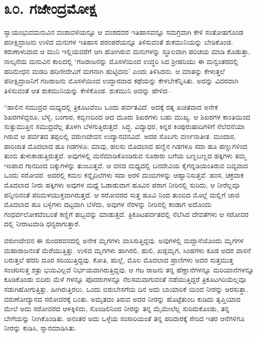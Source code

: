 
\chapter{೩೦. ಗಜೇಂದ್ರಮೋಕ್ಷ}

ಸ್ವಾಯಂಭುವಮನುವಿನ ವಂಶಾವಳಿಯನ್ನೂ ಆ ವಂಶದವರ ಇತಿಹಾಸವನ್ನೂ ಸಮಗ್ರವಾಗಿ ಕೇಳಿ ಸಂತೋಷಗೊಂಡ ಪರೀಕ್ಷಿದ್ರಾಜನು ಉಳಿದ ಮನುಗಳ ಇತಿಹಾಸ ಪರಂಪರೆಯನ್ನೂ ತಿಳಿಸುವಂತೆ ಶುಕಮುನಿಯನ್ನು ಬೇಡಿಕೊಂಡ. ಕರುಣಾಳುವಾದ ಆ ಮುನಿ ಇಲ್ಲಿಯವರೆಗೆ ಆಗಿ ಹೋಗಿರುವ ಮನುಗಳನ್ನು ಸ್ಥೂಲವಾಗಿ ಪರಿಚಯ ಮಾಡಿ ಕೊಡುತ್ತಾ, ನಾಲ್ಕನೆಯ ಮನುವಿನ ಕಾಲದಲ್ಲಿ ‘ಗಜರಾಜನನ್ನು ಮೊಸಳೆಯಿಂದ ಉದ್ಧರಿ ಸಿದ ಶ್ರೀಹರಿಯು ಈ ಮನ್ವಂತರದಲ್ಲಿ ಹರಿಮೇಧನ ಮಡದಿ ಹರಿಣೀದೇವಿಗೆ ಮಗನಾಗಿ ಹುಟ್ಟಿದನು’ ಎಂದು ತಿಳಿಸಿದನು. ಆ ಮಾತನ್ನು ಕೇಳುತ್ತಲೆ ಪರೀಕ್ಷಿದ್ರಾಜನಿಗೆ ಗಜರಾಜನು ಮೊಸಳೆಯಿಂದ ಉದ್ಧಾರವಾದ ಕಥೆಯನ್ನು ಕೇಳಬೇಕೆನ್ನಿಸಿತು. ಅದನ್ನು ವಿವರವಾಗಿ ತಿಳಿಸುವಂತೆ ಆತ ಶುಕಮುನಿಯನ್ನು ಕೇಳಿಕೊಂಡ. ಶುಕಮುನಿ ಅದನ್ನು ಹೇಳಿದ–

“ಹಾಲಿನ ಸಮುದ್ರದ ಮಧ್ಯದಲ್ಲಿ ತ್ರಿಕೂಟವೆಂಬ ಒಂದು ಪರ್ವತವಿದೆ. ಅದಕ್ಕೆ ರತ್ನ ಖಚಿತವಾದ ಅನೇಕ ಶಿಖರಗಳಿದ್ದರೂ, ಬೆಳ್ಳಿ, ಬಂಗಾರ, ಕಬ್ಬಿಣದಿಂದ ಆದ ಮೂರು ಶಿಖರಗಳು ಬಹು ಮುಖ್ಯ. ಆ ಶಿಖರಗಳ ಕಾಂತಿಯಿಂದ ಸುತ್ತುಮುತ್ತಿನ ಸಮುದ್ರವೆಲ್ಲ ತೊಳಗಿ ಬೆಳಗುತ್ತಿರುತ್ತದೆ. ಸಿದ್ಧ, ವಿದ್ಯಾಧರ, ಕಿನ್ನರ ಕಿಂಪುರುಷಾದಿಗಳಿಗೆ ನೆಲೆವನೆಯಾ ಗಿರುವ ಆ ಪರ್ವತದ ತಪ್ಪಲಲ್ಲಿ ವರುಣದೇವನ ಉದ್ಯಾನವನವಿದೆ. ಅದರ ಸೊಬಗು ವರ್ಣನಾತೀತ. ಮಂದಾರ, ಪಾರಿಜಾತ ಮೊದಲಾದ ಹೂ ಗಿಡಗಳೂ; ಮಾವು, ಹಲಸು ಮೊದಲಾದ ಹಣ್ಣಿನ ಗಿಡಗಳೂ ಸದಾ ಹೂ ಹಣ್ಣುಗಳಿಂದ ತುಂಬಿ ತುಳುಕಾಡುತ್ತಿರುತ್ತವೆ. ಅವುಗಳಲ್ಲಿ ಮನೆಮಾಡಿಕೊಂಡಿರುವ ನೂರಾರು ಬಗೆಯ ಬಣ್ಣಬಣ್ಣದ ಹಕ್ಕಿಗಳು ತಮ್ಮ ಇಂಪಾದ ಗಾನದಿಂದ ದಿಕ್ಕುಗಳನ್ನು ತುಂಬುತ್ತವೆ. ಆ ವನದ ಮಧ್ಯದಲ್ಲಿ ಬನದೇವಿಯ ಕೈಗನ್ನಡಿಯಂತಿರುವ ದಿವ್ಯವಾದ ಒಂದು ಸರೋವರ. ಅದರಲ್ಲಿ ಕಮಲ ಕನ್ನೈದಿಲೆಗಳು ಸದಾ ಅರಳಿ ದುಂಬಿಗಳನ್ನು ಆಹ್ವಾನಿಸುತ್ತವೆ. ಹಂಸ, ಚಕ್ರವಾಕ ಮೊದಲಾದ ನೀರು ಹಕ್ಕಿಗಳು ಅವುಗಳ ಮಧ್ಯೆ ಓಡಾಡುವಾಗ ಹೂವಿನ ಪರಾಗ ನೀರಿನಲ್ಲಿ ಸುರಿದು, ಆ ನೀರೆಲ್ಲವೂ ಪನ್ನೀರಿನಂತೆ ಪರಿಮಳಯುಕ್ತವಾಗಿರುತ್ತದೆ. ಆ ಸರೋವರದ ಸುತ್ತ ಹೂವಿ ನಿಂದ ತುಂಬಿದ ಮೊಲ್ಲೆ ಮಲ್ಲಿಗೆ ಜಾಜಿ ಮೊದಲಾದ ಹೂ ಬಳ್ಳಿಗಳು ದಟ್ಟವಾಗಿ ಬೆಳೆದು, ಅವುಗಳ ನೆರಳನ್ನು ನೀರಿನಲ್ಲಿ ಕಂಡಾಗ ಅದೊಂದು ಗಂಧರ್ವಲೋಕವೆಂಬಂತೆ ಕಣ್ಣಿಗೆ ಹಬ್ಬವನ್ನು ಮಾಡುತ್ತದೆ. ತ್ರಿಕೂಟಪರ್ವತದಲ್ಲಿ ನೆಲೆಸಿದ ದೇವತೆಗಳು ಆ ಸರೋವರ ದಲ್ಲಿ ನೀರಾಟವಾಡಿ ಧನ್ಯರಾಗುತ್ತಾರೆ.

ವರುಣದೇವನ ಈ ಸುಂದರವನದಲ್ಲಿ ಅನೇಕ ಮೃಗಗಳು ವಾಸಿಸುತ್ತಿದ್ದವು. ಅವುಗಳಲ್ಲಿ ಮದ್ದಾನೆಯೊಂದು ಮೃಗಗಳ ಮಹಾರಾಜನಂತೆ ಮೆರೆಯುತ್ತಿತ್ತು. ಉಳಿದ ಮೃಗಗಳು ಹಾಗಿರಲಿ, ಹುಲಿ, ಖಡ್ಗಮೃಗ, ಸಿಂಹಗಳು ಕೂಡ ಅದರ ವಾಸನೆ ಬರುತ್ತಲೆ ಹೆದರಿ ದೂರ ಸರಿಯುತ್ತಿದ್ದವು. ಕೋತಿ, ಹುಲ್ಲೆ, ಮೊಲ ಮೊದಲಾದ ಪ್ರಾಣಿಗಳು ಅದರ ಸುತ್ತಮುತ್ತ ಸಂಚರಿಸುತ್ತ ಶತ್ರು ಭಯವಿಲ್ಲದೆ ನಿರ್ಭಯವಾಗಿರುತ್ತಿದ್ದವು. ಆ ಗಜ ರಾಜನು ತನ್ನ ಹೆಣ್ಣಾನೆಗಳನ್ನೂ ಮರಿಯಾನೆಗಳನ್ನೂ ಕೂಡಿಕೊಂಡು ಬಿದಿರು ಮೆಳೆ ಗಳನ್ನೂ ಪೊದರುಗಳನ್ನೂ ನೆಲಸಮವಾಗುವಂತೆ ನಡೆಯುತ್ತಿದ್ದರೆ ತ್ರಿಕೂಟಗಿರಿಯೆಲ್ಲವೂ ನಡುಗಿಹೋಗುತ್ತಿತ್ತು. ಹೀಗಿರುತ್ತಿರಲು, ಒಂದು ಬಿರುಬೇಸಗೆಯ ದಿನ ಅದು ಬಾಯಾರಿಕೆ ಯಿಂದ ನೀರನ್ನು ಅರಸುತ್ತಾ, ವರುಣೋದ್ಯಾನದ ಸರೋವರಕ್ಕೆ ಬಂತು. ಅಮೃತದಂ ತಿರುವ ಅದರ ನೀರನ್ನು ಹೊಟ್ಟೆತುಂಬ ಕುಡಿದು ತೃಪ್ತಿಯಾದ ಮೇಲೆ ಅದು ಸರೋವರದ ಆಳಕ್ಕಿಳಿದು, ಸೊಂಡಿಲಿನಿಂದ ನೀರನ್ನು ತನ್ನ ಮೈಮೇಲೆಲ್ಲ ಸುರಿದುಕೊಂಡು, ತನ್ನ ಬೇಗೆಯನ್ನು ನೀಗಿಕೊಂಡಿತು. ಅನಂತರ ಅದು ಒಳ್ಳೆಯ ಸಂಸಾರಿಯಂತೆ ತನ್ನ ಪರಿವಾರಕ್ಕೆ ಸೇರಿದ ಇತರ ಆನೆಗಳಿಗೂ ನೀರನ್ನು ಕುಡಿಸಿ, ಸ್ನಾನಮಾಡಿಸಿತು.

